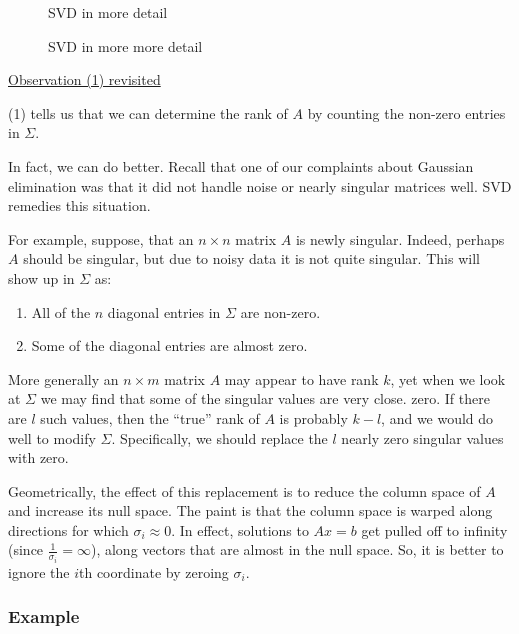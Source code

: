 \begin{figure}[h]
  \centering
  \resizebox{\columnwidth}{!}{
    
  }
  \caption{SVD in more detail}
  \label{fig:linear-2}
\end{figure}


\begin{figure}
  \centering
  \label{fig:linear-3}
  \caption{SVD in more more detail}
  \resizebox{\columnwidth}{!}{
    
  }
\end{figure}
\underline{Observation (1) revisited}

(1) tells us that we can determine the rank of $A$ by counting the non-zero entries in $\Sigma$. 

In fact, we can do better. Recall that one of our complaints about Gaussian elimination was that it did not handle noise or nearly singular matrices well. SVD remedies this situation.

For example, suppose, that an $n \times n$ matrix $A$ is newly singular. Indeed, perhaps $A$ should be singular, but due to noisy data it is not quite singular. This will show up in $\Sigma$ as:
\begin{enumerate}
    \item All of the $n$ diagonal entries in $\Sigma$ are non-zero.
    \item Some of the diagonal entries are almost zero.
\end{enumerate}

More generally an $n \times m$ matrix $A$ may appear to have rank $k$, yet when we look at $\Sigma$ we may find that some of the singular values are very close. zero. If there are $l$ such values, then the ``true'' rank of $A$ is probably $k-l$, and we would do well to modify $\Sigma$. Specifically, we should replace the $l$ nearly zero singular values with zero. 

Geometrically, the effect of this replacement is to reduce the column space of $A$ and increase its null space. The paint is that the column space is warped along directions for which $\sigma_i \approx 0$. In effect, solutions to $Ax=b$ get pulled off to infinity (since $\frac{1}{\sigma_i} = \infty$), along vectors that are almost in the null space. So, it is better to ignore the $i$th coordinate by zeroing $\sigma_i$. 

\subsubsection*{Example}

